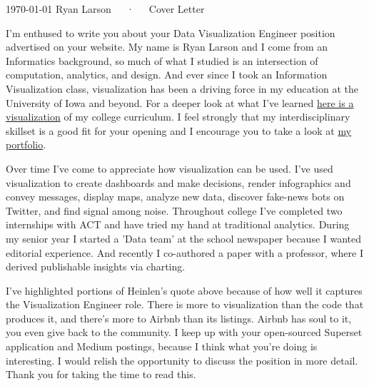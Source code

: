 \documentclass[11pt, letterpaper]{awesome-cv}
\begin{document}
\makecvheader

\makecvfooter
  {\today}
  {Ryan Larson~~~·~~~Cover Letter}
  {}

\makelettertitle

\begin{cvletter}
I'm enthused to write you about your Data Visualization Engineer position advertised on your website. My name is Ryan Larson and I come from an Informatics background, so much of what I studied is an intersection of computation, analytics, and design. And ever since I took an Information Visualization class, visualization has been a driving force in my education at the University of Iowa and beyond. For a deeper look at what I've learned \href{https://ryan-p-larson.github.io/college-sankey/large.html}{here is a visualization} of my college curriculum. I feel strongly that my interdisciplinary skillset is a good fit for your opening and I encourage you to take a look at \href{https://github.com/ryan-p-larson/CV}{my portfolio}.

Over time I've come to appreciate how visualization can be used. I've used visualization to create dashboards and make decisions, render infographics and convey messages, display maps, analyze new data, discover fake-news bots on Twitter, and find signal among noise. Throughout college I've completed two internships with ACT and have tried my hand at traditional analytics. During my senior year I started a 'Data team' at the school newspaper because I wanted editorial experience. And recently I co-authored a paper with a professor, where I derived publishable insights via charting.

I've highlighted portions of Heinlen's quote above because of how well it captures the Visualization Engineer role. There is more to visualization than the code that produces it, and there's more to Airbnb than its listings. Airbnb has soul to it, you even give back to the community. I keep up with your open-sourced Superset application and Medium postings, because I think what you're doing is interesting. I would relish the opportunity to discuss the position in more detail. Thank you for taking the time to read this.

\end{cvletter}


\makeletterclosing
\end{document}
